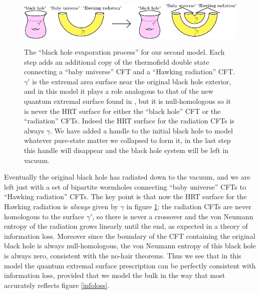 \documentclass[12pt]{article}
\newcommand{\bfig}{\begin{figure}\begin{center}}
\newcommand{\efig}{\end{center}\end{figure}}
\theoremstyle{definition}
\begin{document}
\bfig
\includegraphics[height=2.5cm]{infoworm.pdf}
\caption{The ``black hole evaporation process'' for our second model.  Each step adds an additional copy of the thermofield double state connecting a ``baby universe'' CFT and a ``Hawking radiation'' CFT.  $\gamma'$ is the extremal area surface near the original black hole exterior, and in this model it plays a role analogous to that of the new quantum extremal surface found in \cite{Almheiri:2019psf,Penington:2019npb,Almheiri:2019hni}, but it is null-homologous so it is never the HRT surface for either the ``black hole'' CFT or the ``radiation'' CFTs.  Indeed the HRT surface for the radiation CFTs is always $\gamma$.  We have added a handle to the initial black hole to model whatever pure-state matter we collapsed to form it, in the last step this handle will disappear and the black hole system will be left in vacuum.}\label{infolossworm}
\efig
Eventually the original black hole has radiated down to the vacuum, and we are left just with a set of bipartite wormholes connecting ``baby universe'' CFTs to ``Hawking radiation'' CFTs.  The key point is that now the HRT surface for the Hawking radiation is \textit{always} given by $\gamma$ in figure \ref{infolossworm}: the radiation CFTs are never homologous to the surface $\gamma'$, so there is never a crossover and the von Neumann entropy of the radiation grows linearly until the end, as expected in a theory of information loss.  Moreover since the boundary of the CFT containing the original black hole is always null-homologous, the von Neumann entropy of this black hole is always zero, consistent with the no-hair theorems.  Thus we see that in this model the quantum extremal surface prescription can be perfectly consistent with information loss, provided that we model the bulk in the way that most accurately reflects figure \ref{infoloss}.
\end{document}
